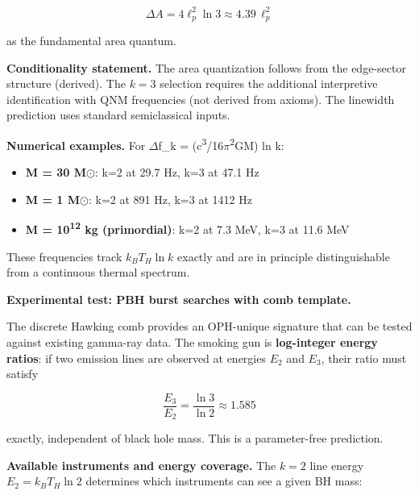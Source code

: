 \documentclass[11pt,a4paper]{article}
\theoremstyle{remark}
\providecommand{\tightlist}{%
  \setlength{\itemsep}{0pt}\setlength{\parskip}{0pt}}
\begin{document}
\[
\Delta A = 4\ell_p^2 \ln 3 \approx 4.39 \, \ell_p^2
\]

as the fundamental area quantum.

\textbf{Conditionality statement.} The area quantization follows from the
edge-sector structure (derived). The \(k = 3\) selection requires the
additional interpretive identification with QNM frequencies (not derived
from axioms). The linewidth prediction uses standard semiclassical inputs.

\textbf{Numerical examples.} For \ensuremath{\Delta}f\_k = (c\textsuperscript{3}/16\ensuremath{\pi}\textsuperscript{2}GM) ln k:

\begin{itemize}
\tightlist
\item
  \textbf{M = 30 M\ensuremath{\odot}}: k=2 at 29.7 Hz, k=3 at 47.1 Hz
\item
  \textbf{M = 1 M\ensuremath{\odot}}: k=2 at 891 Hz, k=3 at 1412 Hz
\item
  \textbf{M = 10\textsuperscript{12} kg (primordial)}: k=2 at 7.3 MeV, k=3 at 11.6 MeV
\end{itemize}

These frequencies track \(k_B T_H \ln k\) exactly and are in principle
distinguishable from a continuous thermal spectrum.

\textbf{Experimental test: PBH burst searches with comb template.}

The discrete Hawking comb provides an OPH-unique signature that can be tested
against existing gamma-ray data. The smoking gun is \textbf{log-integer energy
ratios}: if two emission lines are observed at energies \(E_2\) and \(E_3\),
their ratio must satisfy

\[
\frac{E_3}{E_2} = \frac{\ln 3}{\ln 2} \approx 1.585
\]

exactly, independent of black hole mass. This is a parameter-free prediction.

\textbf{Available instruments and energy coverage.} The \(k = 2\) line energy
\(E_2 = k_B T_H \ln 2\) determines which instruments can see a given BH mass:
\end{document}
